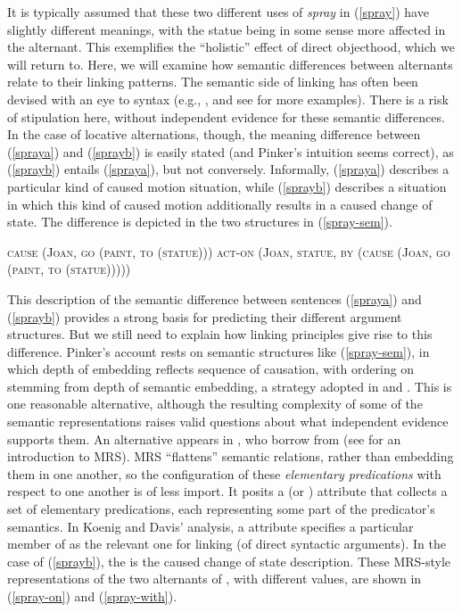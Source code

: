 \documentclass[output=paper
	        ,collection
	        ,collectionchapter
 	        ,biblatex
                ,babelshorthands
                ,newtxmath
                ,draftmode
                ,colorlinks, citecolor=brown
]{langscibook}
\begin{document}
It is typically assumed that these two different uses of \textit{spray} in (\ref{spray}) have slightly different meanings, with the statue being in some sense more affected in the  alternant.
This exemplifies the ``holistic'' effect of direct objecthood,  which we will return to.
Here, we will examine how semantic differences between alternants relate to their linking patterns.
The semantic side of linking has often been devised with an eye to syntax (e.g., \citealt{Pinker1989}, and see \citealt{KoenigandDavis2006} for more examples).
There is a risk of stipulation here, without independent evidence for these semantic differences.
In the case of locative alternations, though, the meaning difference between (\ref{spraya}) and (\ref{sprayb}) is easily stated (and Pinker's intuition seems correct), as (\ref{sprayb}) entails (\ref{spraya}), but not conversely.
Informally, (\ref{spraya}) describes a particular kind of caused motion situation, while  (\ref{sprayb}) describes a situation in which this kind of caused motion additionally results in a caused change of state.
The difference is depicted in the two structures in (\ref{spray-sem}).

\begin{exe}\ex\label{spray-sem}
\begin{xlist}
\ex \label{spray-sema} \textsc{cause (Joan, go (paint, to (statue)))}
\ex \label{spray-semb} \textsc{act-on (Joan, statue, by (cause (Joan, go (paint, to (statue)))))}
\end{xlist}
\end{exe}

This description of the semantic difference between sentences (\ref{spraya}) and (\ref{sprayb}) provides a strong basis for predicting their different argument structures.
But we still need to explain how linking principles give rise to this difference.
Pinker's account rests on semantic structures like (\ref{spray-sem}), in which depth of embedding reflects sequence of causation, with ordering on \argst stemming from depth of semantic embedding, a strategy adopted in \citet{Davis1996} and \citet{Davis2001}.
This is one reasonable alternative, although the resulting complexity of some of the semantic representations raises valid questions about what independent evidence supports them.
An alternative appears in \citet{KoenigandDavis2006}, who borrow from  (see  for an introduction to MRS).
MRS ``flattens'' semantic relations, rather than embedding them in one another, so the configuration of these \emph{elementary predications}  with respect to one another is of less import.
It posits a  (or \rels)  attribute that collects a set of elementary predications, each representing some part of the predicator's semantics.
In Koenig and Davis' analysis, a  attribute specifies a particular member of \rels as the relevant one for linking (of direct syntactic arguments). 
In the case of (\ref{sprayb}), the  is the caused change of state description.
These MRS-style representations of the two alternants of , with different  values, are shown in (\ref{spray-on}) and (\ref{spray-with}).
\end{document}
